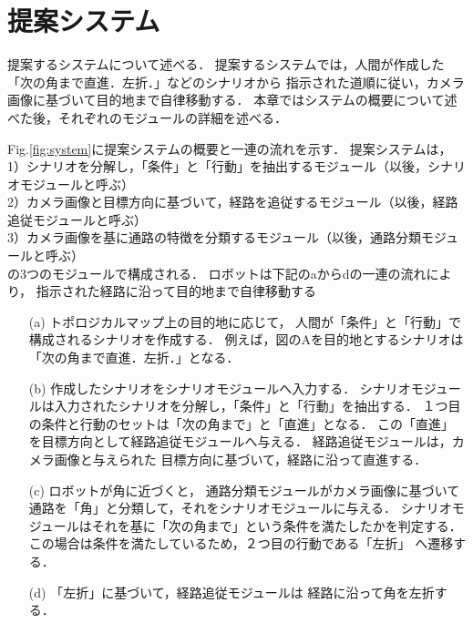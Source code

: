 \documentclass{sice-si}
\begin{document}
\section{提案システム}
提案するシステムについて述べる．
提案するシステムでは，人間が作成した「次の角まで直進．左折．」などのシナリオから
指示された道順に従い，カメラ画像に基づいて目的地まで自律移動する．
本章ではシステムの概要について述べた後，それぞれのモジュールの詳細を述べる．
\par
Fig.\ref{fig:system}に提案システムの概要と一連の流れを示す．
提案システムは，\\
1）シナリオを分解し，「条件」と「行動」を抽出するモジュール（以後，シナリオモジュールと呼ぶ）\\
2）カメラ画像と目標方向に基づいて，経路を追従するモジュール（以後，経路追従モジュールと呼ぶ）\\
3）カメラ画像を基に通路の特徴を分類するモジュール（以後，通路分類モジュールと呼ぶ）\\
の3つのモジュールで構成される．
ロボットは下記のaからdの一連の流れにより，
指示された経路に沿って目的地まで自律移動する
\begin{enumerate}
    \item [(a)] トポロジカルマップ上の目的地に応じて，
    人間が「条件」と「行動」で構成されるシナリオを作成する．
    例えば，図のAを目的地とするシナリオは「次の角まで直進．左折．」となる．
    \item [(b)] 作成したシナリオをシナリオモジュールへ入力する．
    シナリオモジュールは入力されたシナリオを分解し，「条件」と「行動」を抽出する．
    １つ目の条件と行動のセットは「次の角まで」と「直進」となる．
    この「直進」を目標方向として経路追従モジュールへ与える．
    経路追従モジュールは，カメラ画像と与えられた
    目標方向に基づいて，経路に沿って直進する．
    \item [(c)] ロボットが角に近づくと，
    通路分類モジュールがカメラ画像に基づいて
    通路を「角」と分類して，それをシナリオモジュールに与える．
    シナリオモジュールはそれを基に「次の角まで」という条件を満たしたかを判定する．
    この場合は条件を満たしているため，２つ目の行動である「左折」
    へ遷移する．
    \item [(d)]「左折」に基づいて，経路追従モジュールは
    経路に沿って角を左折する．
\end{enumerate}
\end{document}
